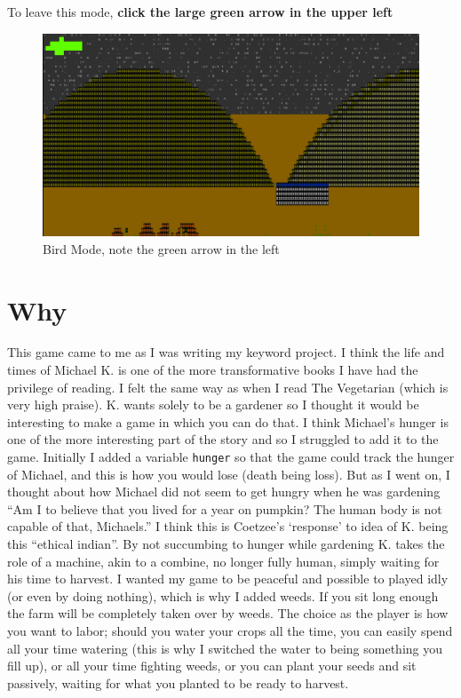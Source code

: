 \documentclass{article}
\begin{document}
To leave this mode, \textbf{click the large green arrow in the upper left}
    \begin{figure}[H]
    \includegraphics[width=\textwidth]{Screenshot 2025-06-05 105052.png}
    \caption{Bird Mode, note the green arrow in the left}
        
    \end{figure}






\section*{Why}
This game came to me as I was writing my keyword project. I think the life and times of Michael K. is one of the more transformative books I have had the privilege of reading. I felt the same way as when I read The Vegetarian (which is very high praise).
K. wants solely to be a gardener so I thought it would be interesting to make a game in which you can do that. I think Michael's hunger is one of the more interesting part of the story and so I struggled to add it to the game. Initially I added a variable \lstinline[language=c]|hunger| so that the game could track the hunger of Michael, and this is how you would lose (death being loss). But as I went on, I thought about how Michael did not seem to get hungry when he was gardening ``Am I to believe that you lived for a year on pumpkin? The human body is not capable of that, Michaels.'' 
I think this is Coetzee's `response' to idea of K. being this ``ethical indian''. By not succumbing to hunger while gardening K. takes the role of a machine, akin to a combine, no longer fully human, simply waiting for his time to harvest. 
I wanted my game to be peaceful and possible to played idly (or even by doing nothing), which is why I added weeds. If you sit long enough the farm will be completely taken over by weeds. The choice as the player is how you want to labor; should you water your crops all the time, you can easily spend all your time watering (this is why I switched the water to being something you fill up), or all your time fighting weeds, or you can plant your seeds and sit passively, waiting for what you planted to be ready to harvest.
\end{document}
